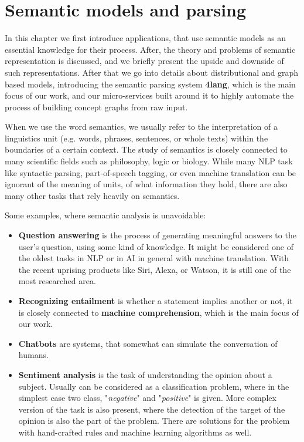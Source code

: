 \chapter{Semantic models and parsing}
\label{chap:semanticparsing}

In this chapter we first introduce applications, that use semantic models as an essential knowledge for their process. After, the theory and problems of semantic representation is discussed, and we briefly present the upside and downside of such representations. After that we go into details about distributional and graph based models, introducing the semantic parsing system \textbf{4lang}, which is the main focus of our work, and our micro-services built around it to highly automate the process of building concept graphs from raw input.

When we use the word semantics, we usually refer to the interpretation of a linguistics unit (e.g. words, phrases, sentences, or whole texts) within the boundaries of a certain context. The study of semantics is closely connected to many scientific fields such as philosophy, logic or biology. While many NLP task like syntactic parsing, part-of-speech tagging, or even machine translation can be ignorant of the meaning of units, of what information they hold, there are also many other tasks that rely heavily on semantics.

Some examples, where semantic analysis is unavoidable:
\begin{itemize}
	\item \textbf{Question answering} is the process of generating meaningful answers to the user's question, using some kind of knowledge. It might be considered one of the oldest tasks in NLP or in AI in general with machine translation. With the recent uprising products like Siri, Alexa, or Watson, it is still one of the most researched area.
	\item \textbf{Recognizing entailment} is whether a statement implies another or not, it is closely connected to \textbf{machine comprehension}, which is the main focus of our work.
	\item \textbf{Chatbots} are systems, that somewhat can simulate the conversation of humans.
	\item \textbf{Sentiment analysis} is the task of understanding the opinion about a subject. Usually can be considered as a classification problem, where in the simplest case two class, "\textit{negative}" and "\textit{positive}" is given. More complex version of the task is also present, where the detection of the target of the opinion is also the part of the problem. There are solutions for the problem with hand-crafted rules and machine learning algorithms as well.  
\end{itemize}

